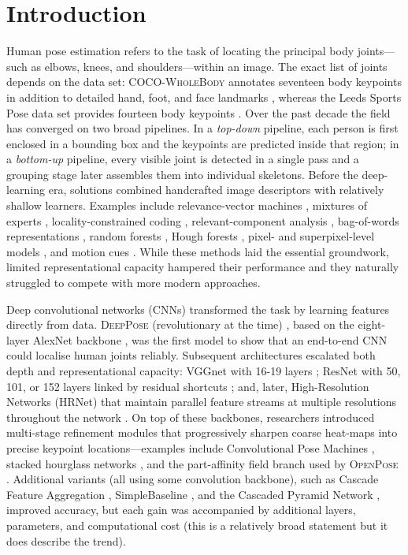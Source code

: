 \section{Introduction}
Human pose estimation refers to the task of locating the principal body
joints—such as elbows, knees, and shoulders—within an image. The exact list of
joints depends on the data set: \textsc{COCO-WholeBody} annotates seventeen
body keypoints in addition to detailed hand, foot, and face landmarks
\cite{jin2020whole}, whereas the Leeds Sports Pose data set provides fourteen
body keypoints \cite{johnson2010clustered}. Over the past decade the field has
converged on two broad pipelines. In a \emph{top-down} pipeline, each person is
first enclosed in a bounding box and the keypoints are predicted inside that
region; in a \emph{bottom-up} pipeline, every visible joint is detected in a
single pass and a grouping stage later assembles them into individual
skeletons. Before the deep-learning era, solutions combined handcrafted image
descriptors with relatively shallow learners. Examples include relevance-vector
machines \cite{tipping2001sparse}, mixtures of experts
\cite{sigal2006predicting}, locality-constrained coding
\cite{wang2010locality}, relevant-component analysis \cite{kanaujia2007semi},
bag-of-words representations \cite{ning2008discriminative}, random forests
\cite{chang2013fast}, Hough forests \cite{girshick2011efficient}, pixel- and
superpixel-level models \cite{wang2011multi}, and motion cues
\cite{sapp2013modec}. While these methods laid the essential groundwork,
limited representational capacity hampered their performance and they naturally
struggled to compete with more modern approaches.

Deep convolutional networks (CNNs) \cite{lecun1998gradient} transformed the
task by learning features directly from data. \textsc{DeepPose} (revolutionary
at the time) \cite{toshev2014deeppose}, based on the eight-layer AlexNet
backbone \cite{krizhevsky2012imagenet}, was the first model to show that an
end-to-end CNN could localise human joints reliably. Subsequent architectures
escalated both depth and representational capacity: VGGnet with 16-19 layers
\cite{simonyan2014very}; ResNet with 50, 101, or 152 layers linked by residual
shortcuts \cite{he2016deep}; and, later, High-Resolution Networks (HRNet) that
maintain parallel feature streams at multiple resolutions throughout the
network \cite{sun2019deep}. On top of these backbones, researchers introduced
multi-stage refinement modules that progressively sharpen coarse heat-maps into
precise keypoint locations—examples include Convolutional Pose Machines
\cite{wei2016convolutional}, stacked hourglass networks
\cite{newell2016stacked}, and the part-affinity field branch used by
\textsc{OpenPose} \cite{cao2017realtime}. Additional variants (all using some
convolution backbone), such as Cascade Feature Aggregation
\cite{su2019cascade}, SimpleBaseline \cite{xiao2018simple}, and the Cascaded
Pyramid Network \cite{chen2018cascaded}, improved accuracy, but each gain was
accompanied by additional layers, parameters, and computational cost (this is a
relatively broad statement but it does describe the trend).

